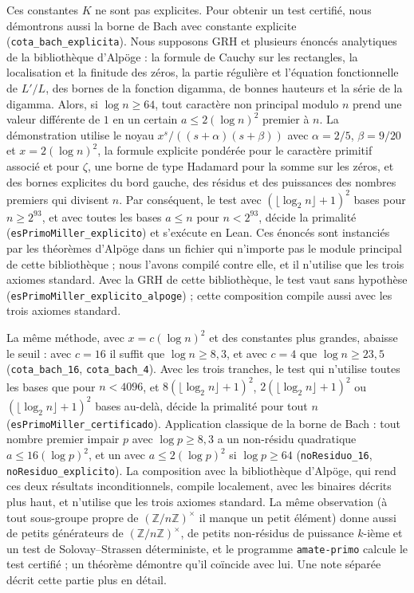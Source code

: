 \documentclass[11pt,a4paper]{amsart}
\theoremstyle{definition}
\theoremstyle{remark}
\begin{document}
Ces constantes $K$ ne sont pas explicites. Pour obtenir un test certifi\'e, nous d\'emontrons aussi la borne de Bach avec constante explicite (\texttt{cota\_bach\_explicita}). Nous supposons GRH et plusieurs \'enonc\'es analytiques de la biblioth\`eque d'Alp\"oge : la formule de Cauchy sur les rectangles, la localisation et la finitude des z\'eros, la partie r\'eguli\`ere et l'\'equation fonctionnelle de $L'/L$, des bornes de la fonction digamma, de bonnes hauteurs et la s\'erie de la digamma. Alors, si $\log n\ge 64$, tout caract\`ere non principal modulo $n$ prend une valeur diff\'erente de $1$ en un certain $a\le 2(\log n)^2$ premier \`a $n$. La d\'emonstration utilise le noyau $x^s/((s+\alpha)(s+\beta))$ avec $\alpha=2/5$, $\beta=9/20$ et $x=2(\log n)^2$, la formule explicite pond\'er\'ee pour le caract\`ere primitif associ\'e et pour $\zeta$, une borne de type Hadamard pour la somme sur les z\'eros, et des bornes explicites du bord gauche, des r\'esidus et des puissances des nombres premiers qui divisent $n$. Par cons\'equent, le test avec $(\lfloor\log_2 n\rfloor+1)^2$ bases pour $n\ge 2^{93}$, et avec toutes les bases $a\le n$ pour $n<2^{93}$, d\'ecide la primalit\'e (\texttt{esPrimoMiller\_explicito}) et s'ex\'ecute en Lean. Ces \'enonc\'es sont instanci\'es par les th\'eor\`emes d'Alp\"oge dans un fichier qui n'importe pas le module principal de cette biblioth\`eque ; nous l'avons compil\'e contre elle, et il n'utilise que les trois axiomes standard. Avec la GRH de cette biblioth\`eque, le test vaut sans hypoth\`ese (\texttt{esPrimoMiller\_explicito\_alpoge}) ; cette composition compile aussi avec les trois axiomes standard.

La m\^eme m\'ethode, avec $x=c(\log n)^2$ et des constantes plus grandes, abaisse le seuil : avec $c=16$ il suffit que $\log n\ge 8{,}3$, et avec $c=4$ que $\log n\ge 23{,}5$ (\texttt{cota\_bach\_16}, \texttt{cota\_bach\_4}). Avec les trois tranches, le test qui n'utilise toutes les bases que pour $n<4096$, et $8(\lfloor\log_2 n\rfloor+1)^2$, $2(\lfloor\log_2 n\rfloor+1)^2$ ou $(\lfloor\log_2 n\rfloor+1)^2$ bases au-del\`a, d\'ecide la primalit\'e pour tout $n$ (\texttt{esPrimoMiller\_\allowbreak certificado}). Application classique de la borne de Bach : tout nombre premier impair $p$ avec $\log p\ge 8{,}3$ a un non-r\'esidu quadratique $a\le 16(\log p)^2$, et un avec $a\le 2(\log p)^2$ si $\log p\ge 64$ (\texttt{noResiduo\_16}, \texttt{noResiduo\_explicito}). La composition avec la biblioth\`eque d'Alp\"oge, qui rend ces deux r\'esultats inconditionnels, compile localement, avec les binaires d\'ecrits plus haut, et n'utilise que les trois axiomes standard. La m\^eme observation (\`a tout sous-groupe propre de $(\mathbb Z/n\mathbb Z)^\times$ il manque un petit \'el\'ement) donne aussi de petits g\'en\'erateurs de $(\mathbb Z/n\mathbb Z)^\times$, de petits non-r\'esidus de puissance $k$-i\`eme et un test de Solovay--Strassen d\'eterministe, et le programme \texttt{amate-primo} calcule le test certifi\'e ; un th\'eor\`eme d\'emontre qu'il co\"incide avec lui. Une note s\'epar\'ee d\'ecrit cette partie plus en d\'etail.
\end{document}
